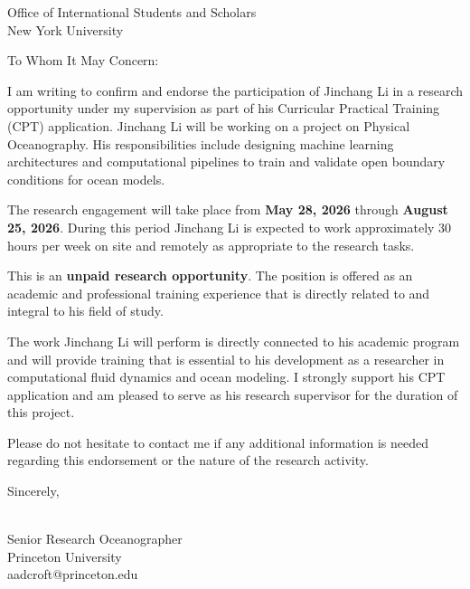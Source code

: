 \documentclass[11pt]{article}
\begin{document}
\vspace*{1.2in}

\vspace{1em}

\noindent Office of International Students and Scholars \\
{New York University}

\vspace{1.5em}

\noindent To Whom It May Concern:

\vspace{1em}

I am writing to confirm and endorse the participation of Jinchang Li in a
research opportunity under my supervision as part of his Curricular
Practical Training (CPT) application. Jinchang Li will be working on a project on Physical Oceanography. His responsibilities include designing machine learning architectures and computational pipelines to train and validate open boundary conditions for ocean models.

The research engagement will take place from \textbf{May 28, 2026}
through \textbf{August 25, 2026}. During this period Jinchang Li is expected
to work approximately 30 hours per week on site and remotely as
appropriate to the research tasks.

This is an \textbf{unpaid research opportunity}. The position is offered as an academic and professional training experience that is directly related to and integral to his
field of study. 

The work Jinchang Li will perform is directly connected to his academic
program and will provide training that is essential to his development
as a researcher in computational fluid dynamics and ocean modeling. I
strongly support his CPT application and am pleased to serve as his
research supervisor for the duration of this project.

Please do not hesitate to contact me if any additional information is
needed regarding this endorsement or the nature of the research
activity.

\vspace{1.5em}

\noindent Sincerely,

\vspace{3em}

 \\
{Senior Research Oceanographer} \\
{Princeton University} \\
{aadcroft@princeton.edu}
\end{document}
